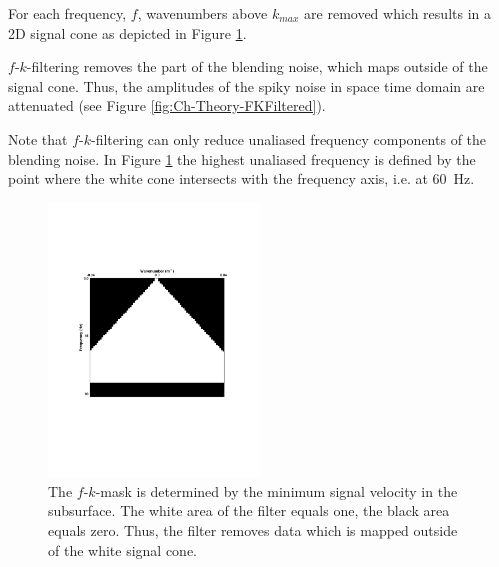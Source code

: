 For each frequency, $f$, wavenumbers above $k_{max}$ are removed which results in a 2D signal cone as depicted in Figure \ref{fig:Ch-Theory-FK-Mask}.

$f$-$k$-filtering removes the part of the blending noise, which maps outside of the signal cone. Thus, the amplitudes of the spiky noise in space time domain are attenuated (see Figure \ref{fig:Ch-Theory-FKFiltered}). 

Note that $f$-$k$-filtering can only reduce unaliased frequency components of the blending noise. In Figure \ref{fig:Ch-Theory-FK-Mask} the highest unaliased frequency is defined by the point where the white cone intersects with the frequency axis, i.e. at \SI{60}{\hertz}.

\begin{figure}
	\centering
	\includegraphics[width = 0.5\textwidth]{Plots/Mahdad/5iter/FK-MaskCRG_rec30}
	\caption{The $f$-$k$-mask is determined by the minimum signal velocity in the subsurface. The white area of the filter equals one, the black area equals zero. Thus, the filter removes data which is mapped outside of the white signal cone.}
	\label{fig:Ch-Theory-FK-Mask}
\end{figure}

 

